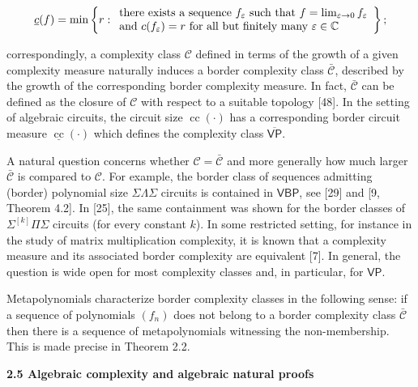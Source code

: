 \[\begin{aligned}
\underline{c}(f)=\min\left\{r:\begin{array}[]{l}\text{there exists a sequence $f_{\varepsilon}$ such that $f=\lim_{\varepsilon\to 0}f_{\varepsilon}$}\\ \text{and $c(f_{\varepsilon})=r$ for all but finitely many $\varepsilon\in\mathbb{C}$}\end{array}\right\};
\end{aligned}\]


correspondingly, a complexity class $\mathcal{C}$ defined in terms of the growth of a given complexity measure naturally induces a border complexity class $\bar{\mathcal{C}}$, described by the growth of the corresponding border complexity measure. In fact, $\bar{\mathcal{C}}$ can be defined as the closure of $\mathcal{C}$ with respect to a suitable topology [48]. In the setting of algebraic circuits, the circuit size $\operatorname{cc}(\cdot)$ has a corresponding border circuit measure $\underline{\operatorname{cc}}(\cdot)$ which defines the complexity class $\overline{\mathsf{VP}}$.





A natural question concerns whether $\mathcal{C}=\bar{\mathcal{C}}$ and more generally how much larger $\bar{\mathcal{C}}$ is compared to $\mathcal{C}$. For example, the border class of sequences admitting (border) polynomial size $\Sigma\Lambda\Sigma$ circuits is contained in $\mathsf{VBP}$, see [29] and [9, Theorem 4.2]. In [25], the same containment was shown for the border classes of $\Sigma^{[k]}\Pi\Sigma$ circuits (for every constant $k$). In some restricted setting, for instance in the study of matrix multiplication complexity, it is known that a complexity measure and its associated border complexity are equivalent [7]. In general, the question is wide open for most complexity classes and, in particular, for $\mathsf{VP}$.





Metapolynomials characterize border complexity classes in the following sense: if a sequence of polynomials $(f_{n})$ does not belong to a border complexity class $\bar{\mathcal{C}}$ then there is a sequence of metapolynomials witnessing the non-membership. This is made precise in Theorem 2.2.






\par\medskip\noindent\textbf{2.5 Algebraic complexity and algebraic natural proofs}\par




